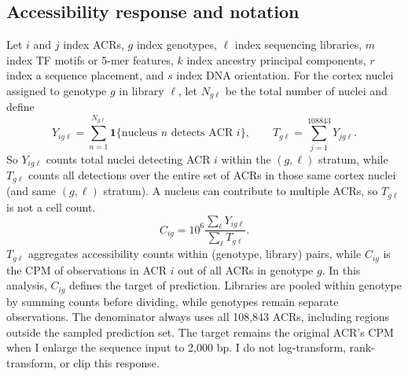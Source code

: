 \documentclass[10pt]{article}
\begin{document}
\subsection{Accessibility response and notation}

Let $i$ and $j$ index ACRs, $g$ index genotypes, $\ell$ index sequencing libraries, $m$ index TF motifs or 5-mer features, $k$ index ancestry principal components, $r$ index a sequence placement, and $s$ index DNA orientation. For the cortex nuclei assigned to genotype $g$ in library $\ell$, let $N_{g\ell}$ be the total number of nuclei and define
\[
Y_{ig\ell}=\sum_{n=1}^{N_{g\ell}}\mathbf{1}\{\text{nucleus }n\text{ detects ACR }i\},
\qquad
T_{g\ell}=\sum_{j=1}^{108843}Y_{jg\ell}.
\]
So $Y_{ig\ell}$ counts total nuclei detecting ACR $i$ within the $(g, \ell)$ stratum, while $T_{g\ell}$ counts all detections over the entire set of ACRs in those same cortex nuclei (and same $(g, \ell)$ stratum). A nucleus can contribute to multiple ACRs, so $T_{g\ell}$ is not a cell count. 
\begin{equation}\label{eq:response}
C_{ig}=10^6\frac{\sum_{\ell}Y_{ig\ell}}{\sum_{\ell}T_{g\ell}}.
\end{equation}
$T_{g\ell}$ aggregates accessibility counts within (genotype, library) pairs, while $C_{ig}$ is the CPM of observations in ACR $i$ out of all ACRs in genotype $g$. In this analysis, $C_{ig}$ defines the target of prediction. Libraries are pooled within genotype by summing counts before dividing, while genotypes remain separate observations. The denominator always uses all 108,843 ACRs, including regions outside the sampled prediction set. The target remains the original ACR's CPM when I enlarge the sequence input to 2,000 bp. I do not log-transform, rank-transform, or clip this response.
\end{document}
